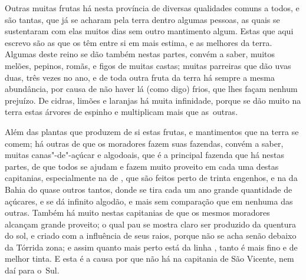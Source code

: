 Outras muitas frutas há nesta província de diversas qualidades comuns a
todos, e são tantas, que já se acharam pela terra dentro algumas
pessoas, as quais se sustentaram com elas muitos dias sem outro
mantimento algum. Estas que aqui escrevo são as que os  têm
entre si em mais estima, e as melhores da terra. Algumas deste reino se
dão também nestas partes, convém a saber, muitos melões, pepinos,		%
romãs, e figos de muitas castas; muitas parreiras que dão uvas duas, 		%
três vezes no ano, e de toda outra fruta da terra há sempre a mesma
abundância, por causa de não haver lá (como digo) frios, que lhes façam
nenhum prejuízo. De cidras, limões e laranjas há muita infinidade,		%
porque se dão muito na terra estas árvores de espinho e multiplicam
mais que \mbox{as outras.}

Além das plantas que produzem de si estas frutas, e mantimentos que na
terra se comem; há outras de que os moradores fazem suas fazendas,
convém a saber, muitas canas"-de"-açúcar e algodoais, que é a principal		%
fazenda que há nestas partes, de que todos se ajudam e fazem muito
proveito em cada uma destas capitanias, especialmente na de ,
que são feitos perto de trinta engenhos, e na da Bahia do 		%
quase outros tantos, donde se tira cada um ano grande quantidade
de açúcares, e se dá infinito algodão, e mais sem comparação que em
nenhuma das outras. Também há muito  nestas capitanias de que
os mesmos moradores alcançam grande proveito; o qual pau se mostra
claro ser produzido da quentura do sol, e criado com a influência de
seus raios, porque não se acha senão debaixo da Tórrida zona; e assim
quanto mais perto está da linha , tanto é mais fino e de
melhor tinta. E esta é a causa por que não há na capitania de São Vicente,		%
nem daí para \mbox{o Sul.}

